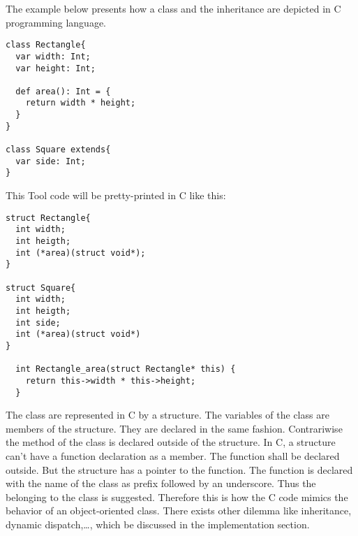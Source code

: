 The example below presents how a class and the inheritance are depicted in C programming language.
\begin{lstlisting}
class Rectangle{
  var width: Int;
  var height: Int;

  def area(): Int = {
    return width * height;
  }
}

class Square extends{
  var side: Int;
}
\end{lstlisting}
This Tool code will be pretty-printed in C like this:
\begin{lstlisting}
struct Rectangle{
  int width;
  int heigth;
  int (*area)(struct void*);
}

struct Square{
  int width;
  int heigth;
  int side;
  int (*area)(struct void*)
}

  int Rectangle_area(struct Rectangle* this) {
    return this->width * this->height;
  }
\end{lstlisting}
The class are represented in C by a structure. The variables of the class
are members of the structure. They are declared in the same fashion.
\newline
Contrariwise the method of the class is declared outside of the structure.
In C, a structure can't have a function declaration as a member. The function shall
be declared outside. But the structure has a pointer to the function.
\newline
The function is declared with the name of the class as prefix followed by an underscore.
Thus the belonging to the  class is suggested.
\newline
Therefore this is how the C code mimics the behavior of an object-oriented class.
\newline
There exists other dilemma like inheritance, dynamic dispatch,\ldots, which be discussed
in the implementation section.
\newline
